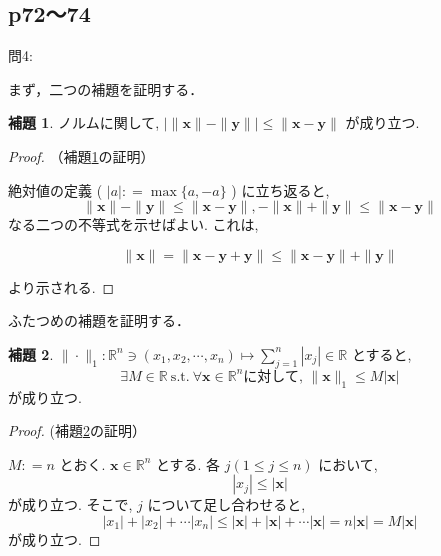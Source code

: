 \documentclass[dvipdfmx,uplatex,11pt]{jsarticle}
\theoremstyle{definition}
\newtheorem{lemm}{補題}[section]
\begin{document}
\subsection{p72〜74}
問4:\par 
まず，二つの補題を証明する．\\
\begin{lemm}
	\label{p72:問4.1}
	ノルムに関して, $| \| \bm x  \|- \| \bm y \| | \leq \| \bm x - \bm y \|$ が成り立つ. 
\end{lemm}
\begin{proof} （補題\ref{p72:問4.1}の証明）\par 
	絶対値の定義 ( $| a | : = \max \{ a , -a \}$ ) に立ち返ると, 
%		
		\[
			\| \bm x  \|- \| \bm y \| \leq \| \bm x - \bm y \| , - \| \bm x  \| + \| \bm y \| \leq \| \bm x - \bm y \|
		\]
%		
	なる二つの不等式を示せばよい. これは, 
		
		\[
			\| \bm x \| = \| \bm x - \bm y + \bm y \| \leq \| \bm x - \bm y \| + \| \bm y \|
		\]
		
	より示される.
\end{proof}
ふたつめの補題を証明する．
\begin{lemm}
	\label{p72:問4.2}
	$\| \cdot \|_1 : \mathbb R^n \ni ( x_1 , x_2 , \cdots , x_n ) \mapsto \sum_{j=1} ^ n |x_j| \in \mathbb R$ とすると, 
%		
		\[
			\exists M \in \mathbb R \ \mathrm{s.t.} \ \forall \bm x \in \mathbb R^n \text {に対して, } \| \bm x \|_1 \leq M | \bm x | 
		\]
%		
	が成り立つ. 
\end{lemm}
\begin{proof} (補題\ref{p72:問4.2}の証明）\par 
	
	$M : = n$ とおく. $\bm x \in \mathbb R^n$ とする. 各 $j ( 1 \leq j \leq n )$ において, 
%		
		\[
			| x_j | \leq | \bm x |
		\]
%		
	が成り立つ. そこで, $j$ について足し合わせると, 
%		
		\[
			| x_1 | + | x_2 | + \cdots | x_n | \leq | \bm x | + | \bm x | + \cdots | \bm x | = n | \bm x | = M | \bm x | 
		\]
%		
	が成り立つ. 
\end{proof}
\dotfill
\end{document}
